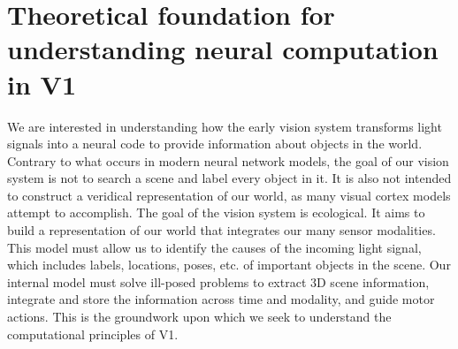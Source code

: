 %
%
%
%
%
%
%
%


\section{Theoretical foundation for understanding neural computation in V1}
We are interested in understanding how the early vision system transforms light signals into a neural code to provide information about objects in the world.
Contrary to what occurs in modern neural network models, the goal of our vision system is not to search a scene and label every object in it. It is also not intended to construct a veridical representation of our world, as many visual cortex models attempt to accomplish. The goal of the vision system is ecological. It aims to build a representation of our world that integrates our many sensor modalities. This model must allow us to identify the causes of the incoming light signal, which includes labels, locations, poses, etc. of important objects in the scene. Our internal model must solve ill-posed problems to extract 3D scene information, integrate and store the information across time and modality, and guide motor actions. This is the groundwork upon which we seek to understand the computational principles of V1.

